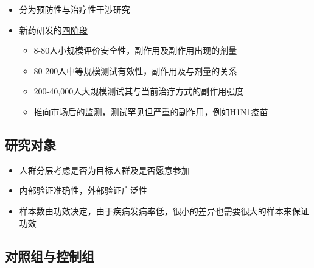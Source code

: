 \documentclass[
]{book}
\providecommand{\tightlist}{%
  \setlength{\itemsep}{0pt}\setlength{\parskip}{0pt}}
\begin{document}
\begin{itemize}
\tightlist
\item
  分为预防性与治疗性干涉研究
\item
  新药研发的\href{https://clinicaltrials.gov/ct2/info/glossary\#phasel}{四阶段}

  \begin{itemize}
  \tightlist
  \item
    8-80人小规模评价安全性，副作用及副作用出现的剂量
  \item
    80-200人中等规模测试有效性，副作用及与剂量的关系
  \item
    200-40,000人大规模测试其与当前治疗方式的副作用强度
  \item
    推向市场后的监测，测试罕见但严重的副作用，例如\href{http://sphweb.bumc.bu.edu/otlt/MPH-Modules/EP/EP713_ClinicalTrials/H1N1_Surveillance.pdf}{H1N1疫苗}
  \end{itemize}
\end{itemize}

\hypertarget{ux7814ux7a76ux5bf9ux8c61}{%
\subsection{研究对象}\label{ux7814ux7a76ux5bf9ux8c61}}

\begin{itemize}
\tightlist
\item
  人群分层考虑是否为目标人群及是否愿意参加
\item
  内部验证准确性，外部验证广泛性
\item
  样本数由功效决定，由于疾病发病率低，很小的差异也需要很大的样本来保证功效
\end{itemize}

\hypertarget{ux5bf9ux7167ux7ec4ux4e0eux63a7ux5236ux7ec4}{%
\subsection{对照组与控制组}\label{ux5bf9ux7167ux7ec4ux4e0eux63a7ux5236ux7ec4}}
\end{document}
